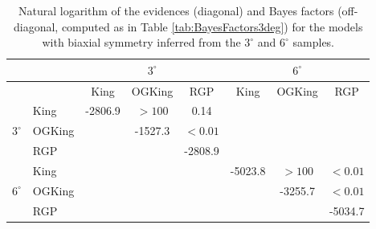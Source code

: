 \begin{table}[ht!]
  \centering
  \caption[]{Natural logarithm of the evidences (diagonal) and Bayes factors (off-diagonal, computed as  in Table \ref{tab:BayesFactors3deg}) for the models with biaxial symmetry inferred from the $3^{\circ}$ and $6^{\circ}$ samples. }
  \label{tab:BayesFactorsEll}

\begin{tabular}{cl|ccc|ccc|}
\hline              
\hline              
&&  \multicolumn{3}{c}{$3^{\circ}$} &   \multicolumn{3}{c}{$6^{\circ}$} \\
\hline              
&&  King & OGKing & RGP &  King &  OGKing & RGP \\
\hline              
\multirow{3}{*}{$3^{\circ}$}           &King    &  -2806.9   &  $>100$   &    0.14   &           &            &               \\
           &OGKing  &            &   -1527.3 & $<0.01$   &           &            &               \\   
           &RGP     &            &           &  -2808.9  &           &            &               \\
           \hline
\multirow{3}{*}{$6^{\circ}$}          &King    &            &           &           &  -5023.8  &  $>100$    &   $<0.01$     \\
           &OGKing  &            &           &           &           &  -3255.7   &   $<0.01$     \\   
           &RGP     &            &           &           &           &            &  -5034.7      \\
\hline              
         \end{tabular}
   \end{table}

